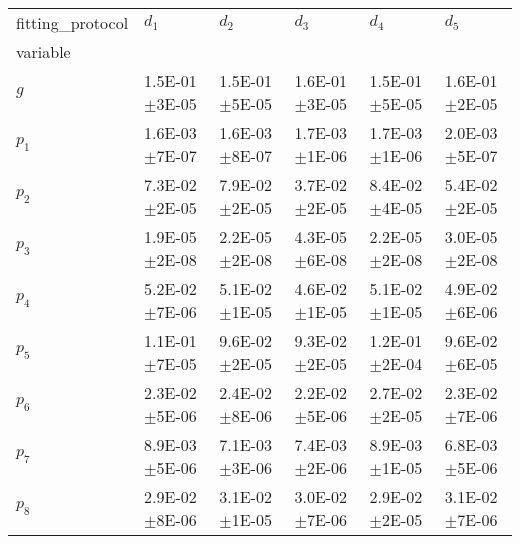 \begin{tabular}{llllll}
fitting_protocol & $d_1$ & $d_2$ & $d_3$ & $d_4$ & $d_5$ \\
variable &  &  &  &  &  \\
$g$ & 1.5E-01\(\pm\)3E-05 & 1.5E-01\(\pm\)5E-05 & 1.6E-01\(\pm\)3E-05 & 1.5E-01\(\pm\)5E-05 & 1.6E-01\(\pm\)2E-05 \\
$p_1$ & 1.6E-03\(\pm\)7E-07 & 1.6E-03\(\pm\)8E-07 & 1.7E-03\(\pm\)1E-06 & 1.7E-03\(\pm\)1E-06 & 2.0E-03\(\pm\)5E-07 \\
$p_2$ & 7.3E-02\(\pm\)2E-05 & 7.9E-02\(\pm\)2E-05 & 3.7E-02\(\pm\)2E-05 & 8.4E-02\(\pm\)4E-05 & 5.4E-02\(\pm\)2E-05 \\
$p_3$ & 1.9E-05\(\pm\)2E-08 & 2.2E-05\(\pm\)2E-08 & 4.3E-05\(\pm\)6E-08 & 2.2E-05\(\pm\)2E-08 & 3.0E-05\(\pm\)2E-08 \\
$p_4$ & 5.2E-02\(\pm\)7E-06 & 5.1E-02\(\pm\)1E-05 & 4.6E-02\(\pm\)1E-05 & 5.1E-02\(\pm\)1E-05 & 4.9E-02\(\pm\)6E-06 \\
$p_5$ & 1.1E-01\(\pm\)7E-05 & 9.6E-02\(\pm\)2E-05 & 9.3E-02\(\pm\)2E-05 & 1.2E-01\(\pm\)2E-04 & 9.6E-02\(\pm\)6E-05 \\
$p_6$ & 2.3E-02\(\pm\)5E-06 & 2.4E-02\(\pm\)8E-06 & 2.2E-02\(\pm\)5E-06 & 2.7E-02\(\pm\)2E-05 & 2.3E-02\(\pm\)7E-06 \\
$p_7$ & 8.9E-03\(\pm\)5E-06 & 7.1E-03\(\pm\)3E-06 & 7.4E-03\(\pm\)2E-06 & 8.9E-03\(\pm\)1E-05 & 6.8E-03\(\pm\)5E-06 \\
$p_8$ & 2.9E-02\(\pm\)8E-06 & 3.1E-02\(\pm\)1E-05 & 3.0E-02\(\pm\)7E-06 & 2.9E-02\(\pm\)2E-05 & 3.1E-02\(\pm\)7E-06 \\
\end{tabular}
